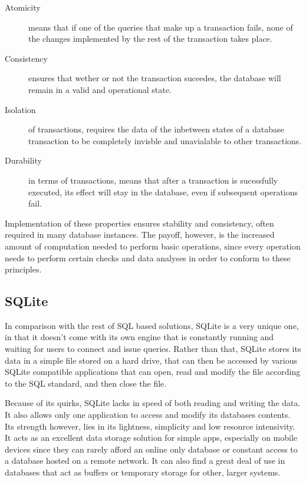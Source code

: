 \begin{description}
  \item[Atomicity] means that if one of the queries that make up a transaction fails, none of the changes implemented by the rest of the transaction takes place.
  \item[Consistency] ensures that wether or not the transaction suceedes, the database will remain in a valid and operational state.
  \item[Isolation] of transactions, requires the data of the inbetween states of a database transaction to be completely invisble and unavialable to other transactions.
  \item[Durability] in terms of transactions, means that after a transaction is sucessfully executed, its effect will stay in the database, even if subsequent operations fail.
\end{description}
\par Implementation of these properties ensures stability and consistency, often required in many database instances. The payoff, however, is the increased amount of computation needed to perform basic operations, since every operation needs to perform certain checks and data analyses in order to conform to these principles.

%
\subsection{SQLite}
\label{subsec:background:first_seciton:first_subsection}
\par In comparison with the rest of SQL based solutions, SQLite is a very unique one, in that it doesn't come with its own engine that is constantly running and waiting for users to connect and issue queries. Rather than that, SQLite stores its data in a simple file stored on a hard drive, that can then be accessed by various SQLite compatible applications that can open, read and modify the file according to the SQL standard, and then close the file\citep{OwensSQLite}.

\par Because of its quirks, SQLite lacks in speed of both reading and writing the data. It also allows only one application to access and modify its databases contents. Its strength however, lies in its lightness, simplicity and low resource intensivity. It acts as an excellent data storage solution for simple apps, especially on mobile devices since they can rarely afford an online only database or constant access to a database hosted on a remote network. It can also find a great deal of use in databases that act as buffers or temporary storage for other, larger systems\citep{OwensSQLite}.

